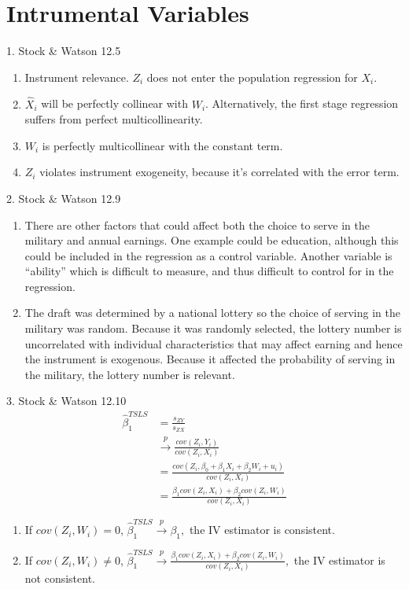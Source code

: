 \documentclass[12pt]{article}
\begin{document}
\section{Intrumental Variables}
1. Stock \& Watson 12.5
\begin{enumerate}
\item Instrument relevance. $Z_i$ does not enter the population regression for $X_i$.

\item $\hat X_i$ will be perfectly collinear with $W_i$. Alternatively, the first stage regression suffers from perfect multicollinearity.

\item $W_i$ is perfectly multicollinear with the constant term.

\item $Z_i$ violates instrument exogeneity, because it's correlated with the error term.
\end{enumerate}


2. Stock \& Watson 12.9
\begin{enumerate}
\item There are other factors that could affect both the choice to serve in the military and annual earnings. One example could be education, although this could be included in the regression as a control variable. Another variable is “ability” which is difficult to measure, and thus difficult to control for in the regression. 

\item The draft was determined by a national lottery so the choice of serving in the military was random. Because it was randomly selected, the lottery number is uncorrelated with individual characteristics that may affect earning and hence the instrument is exogenous. Because it affected the probability of serving in the military, the lottery number is relevant.
\end{enumerate}

3. Stock \& Watson 12.10
\begin{align*}
\hat{\beta}_{1}^{TSLS}&=\frac{s_{ZY}}{s_{ZX}}\\
&\xrightarrow{p}\frac{cov(Z_{i},Y_{i})}{cov(Z_{i},X_{i})}\\
&=\frac{cov(Z_{i},\beta_{0}+\beta_{1}X_{i}+\beta_{2}W_{i}+u_{i})}{cov(Z_{i},X_{i})}\\
&=\frac{\beta_{1}cov(Z_{i},X_{i})+\beta_{2}cov(Z_{i},W_{i})}{cov(Z_{i},X_{i})}
\end{align*}

\begin{enumerate}
\item If $cov(Z_{i},W_{i})=0$, $\hat{\beta}_{1}^{TSLS}\xrightarrow{p}\beta_{1},$
the IV estimator is consistent.
\item If $cov(Z_{i},W_{i})\neq0$, $\hat{\beta}_{1}^{TSLS}\xrightarrow{p}\frac{\beta_{1}cov(Z_{i},X_{i})+\beta_{2}cov(Z_{i},W_{i})}{cov(Z_{i},X_{i})},$
the IV estimator is not consistent.
\end{enumerate}
\end{document}

